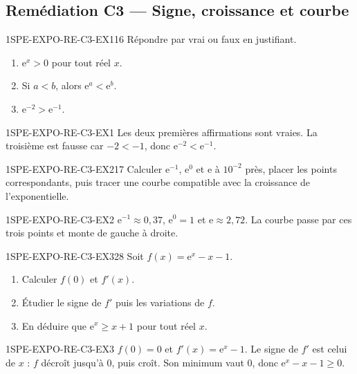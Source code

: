 
\subsection*{Remédiation C3 — Signe, croissance et courbe}

\begin{exercice}{1SPE-EXPO-RE-C3-EX1}{1}{6}
Répondre par vrai ou faux en justifiant.
\begin{enumerate}
\item $\mathrm{e}^x>0$ pour tout réel $x$.
\item Si $a<b$, alors $\mathrm{e}^a<\mathrm{e}^b$.
\item $\mathrm{e}^{-2}>\mathrm{e}^{-1}$.
\end{enumerate}
\end{exercice}
\begin{corrige}{1SPE-EXPO-RE-C3-EX1}
Les deux premières affirmations sont vraies. La troisième est fausse car $-2<-1$, donc $\mathrm{e}^{-2}<\mathrm{e}^{-1}$.
\end{corrige}

\begin{exercice}{1SPE-EXPO-RE-C3-EX2}{1}{7}
Calculer $\mathrm{e}^{-1}$, $\mathrm{e}^{0}$ et $\mathrm{e}$ à $10^{-2}$ près, placer les points correspondants, puis tracer une courbe compatible avec la croissance de l'exponentielle.
\end{exercice}
\begin{corrige}{1SPE-EXPO-RE-C3-EX2}
$\mathrm{e}^{-1}\approx0{,}37$, $\mathrm{e}^{0}=1$ et $\mathrm{e}\approx2{,}72$. La courbe passe par ces trois points et monte de gauche à droite.
\end{corrige}

\begin{exercice}{1SPE-EXPO-RE-C3-EX3}{2}{8}
Soit $f(x)=\mathrm{e}^x-x-1$.
\begin{enumerate}
\item Calculer $f(0)$ et $f'(x)$.
\item Étudier le signe de $f'$ puis les variations de $f$.
\item En déduire que $\mathrm{e}^x\geqslant x+1$ pour tout réel $x$.
\end{enumerate}
\end{exercice}
\begin{corrige}{1SPE-EXPO-RE-C3-EX3}
$f(0)=0$ et $f'(x)=\mathrm{e}^x-1$. Le signe de $f'$ est celui de $x$ : $f$ décroît jusqu'à $0$, puis croît. Son minimum vaut $0$, donc $\mathrm{e}^x-x-1\geqslant0$.
\end{corrige}

